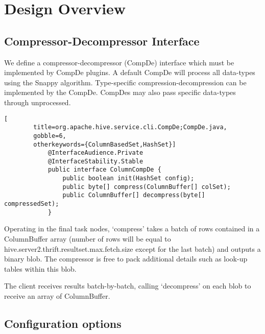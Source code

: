 \documentclass[11pt,a4paper]{article}
\begin{document}
\section{Design Overview}

	\subsection{Compressor-Decompressor Interface}
		
		We define a compressor-decompressor (CompDe) interface which must be implemented by CompDe plugins.
		A default CompDe will process all data-types using the Snappy algorithm.
		Type-specific compression-decompression can be implemented by the CompDe.
		CompDes may also pass specific data-types through unprocessed.
		
		\begin{lstlisting}[
		title=org.apache.hive.service.cli.CompDe;CompDe.java,
		gobble=6,
		otherkeywords={ColumnBasedSet,HashSet}]
			@InterfaceAudience.Private
			@InterfaceStability.Stable
			public interface ColumnCompDe {
				public boolean init(HashSet config);
				public byte[] compress(ColumnBuffer[] colSet);
				public ColumnBuffer[] decompress(byte[] compressedSet);
			}
		\end{lstlisting}
		
		Operating in the final task nodes, `compress' takes a batch of rows contained in a ColumnBuffer array (number of rows will be equal to \linebreak hive.server2.thrift.resultset.max.fetch.size except for the last batch) and outputs a binary blob.
		The compressor is free to pack additional details such as look-up tables within this blob.
		
		The client receives results batch-by-batch, calling `decompress' on each blob to receive an array of ColumnBuffer.
		
	\subsection{Configuration options}
		
\end{document}
